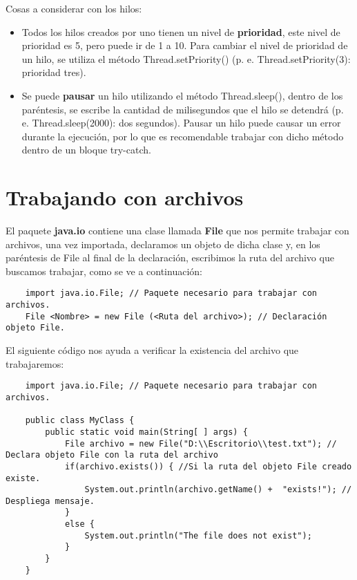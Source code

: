 Cosas a considerar con los hilos:
\begin{itemize}
    \item Todos los hilos creados por uno tienen un nivel de \textbf{prioridad}, este nivel de prioridad es 5, pero puede ir de 1 a 10. Para cambiar el nivel de prioridad de un hilo, se utiliza el método Thread.setPriority() (p. e. Thread.setPriority(3): prioridad tres).
    \item Se puede \textbf{pausar} un hilo utilizando el método Thread.sleep(), dentro de los paréntesis, se escribe la cantidad de milisegundos que el hilo se detendrá (p. e. Thread.sleep(2000): dos segundos). Pausar un hilo puede causar un error durante la ejecución, por lo que es recomendable trabajar con dicho método dentro de un bloque try-catch.
\end{itemize}



\section{Trabajando con archivos}

El paquete \textbf{java.io} contiene una clase llamada \textbf{File} que nos permite trabajar con archivos, una vez importada, declaramos un objeto de dicha clase y, en los paréntesis de File al final de la declaración, escribimos la ruta del archivo que buscamos trabajar, como se ve a continuación:
\begin{lstlisting}
    import java.io.File; // Paquete necesario para trabajar con archivos.
    File <Nombre> = new File (<Ruta del archivo>); // Declaración objeto File.
\end{lstlisting}

El siguiente código nos ayuda a verificar la existencia del archivo que trabajaremos:
\begin{lstlisting}
    import java.io.File; // Paquete necesario para trabajar con archivos.

    public class MyClass {
        public static void main(String[ ] args) {
            File archivo = new File("D:\\Escritorio\\test.txt"); // Declara objeto File con la ruta del archivo
            if(archivo.exists()) { //Si la ruta del objeto File creado existe.
                System.out.println(archivo.getName() +  "exists!"); // Despliega mensaje.
            }
            else { 
                System.out.println("The file does not exist");
            }
        }
    }
\end{lstlisting}

